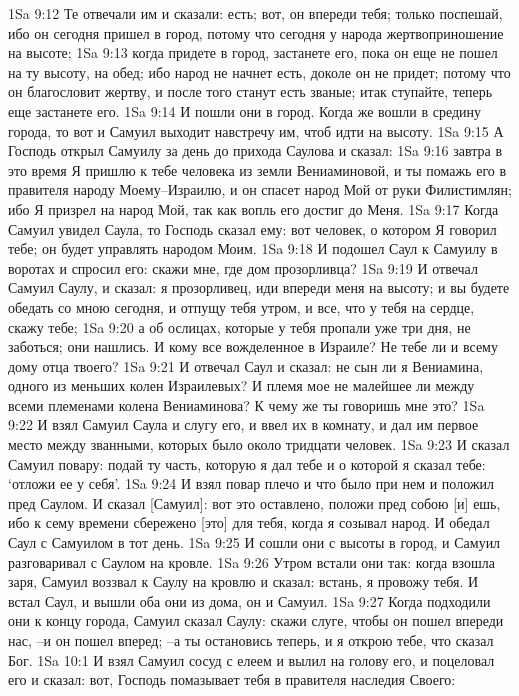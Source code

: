 1Sa 9:12  Те отвечали им и сказали: есть; вот, он впереди тебя; только поспешай, ибо он сегодня пришел в город, потому что сегодня у народа жертвоприношение на высоте;
1Sa 9:13  когда придете в город, застанете его, пока он еще не пошел на ту высоту, на обед; ибо народ не начнет есть, доколе он не придет; потому что он благословит жертву, и после того станут есть званые; итак ступайте, теперь еще застанете его.
1Sa 9:14  И пошли они в город. Когда же вошли в средину города, то вот и Самуил выходит навстречу им, чтоб идти на высоту.
1Sa 9:15  А Господь открыл Самуилу за день до прихода Саулова и сказал:
1Sa 9:16  завтра в это время Я пришлю к тебе человека из земли Вениаминовой, и ты помажь его в правителя народу Моему--Израилю, и он спасет народ Мой от руки Филистимлян; ибо Я призрел на народ Мой, так как вопль его достиг до Меня.
1Sa 9:17  Когда Самуил увидел Саула, то Господь сказал ему: вот человек, о котором Я говорил тебе; он будет управлять народом Моим.
1Sa 9:18  И подошел Саул к Самуилу в воротах и спросил его: скажи мне, где дом прозорливца?
1Sa 9:19  И отвечал Самуил Саулу, и сказал: я прозорливец, иди впереди меня на высоту; и вы будете обедать со мною сегодня, и отпущу тебя утром, и все, что у тебя на сердце, скажу тебе;
1Sa 9:20  а об ослицах, которые у тебя пропали уже три дня, не заботься; они нашлись. И кому все вожделенное в Израиле? Не тебе ли и всему дому отца твоего?
1Sa 9:21  И отвечал Саул и сказал: не сын ли я Вениамина, одного из меньших колен Израилевых? И племя мое не малейшее ли между всеми племенами колена Вениаминова? К чему же ты говоришь мне это?
1Sa 9:22  И взял Самуил Саула и слугу его, и ввел их в комнату, и дал им первое место между званными, которых было около тридцати человек.
1Sa 9:23  И сказал Самуил повару: подай ту часть, которую я дал тебе и о которой я сказал тебе: `отложи ее у себя'.
1Sa 9:24  И взял повар плечо и что было при нем и положил пред Саулом. И сказал [Самуил]: вот это оставлено, положи пред собою [и] ешь, ибо к сему времени сбережено [это] для тебя, когда я созывал народ. И обедал Саул с Самуилом в тот день.
1Sa 9:25  И сошли они с высоты в город, и Самуил разговаривал с Саулом на кровле.
1Sa 9:26  Утром встали они так: когда взошла заря, Самуил воззвал к Саулу на кровлю и сказал: встань, я провожу тебя. И встал Саул, и вышли оба они из дома, он и Самуил.
1Sa 9:27  Когда подходили они к концу города, Самуил сказал Саулу: скажи слуге, чтобы он пошел впереди нас, --и он пошел вперед; --а ты остановись теперь, и я открою тебе, что сказал Бог.
1Sa 10:1  И взял Самуил сосуд с елеем и вылил на голову его, и поцеловал его и сказал: вот, Господь помазывает тебя в правителя наследия Своего:

